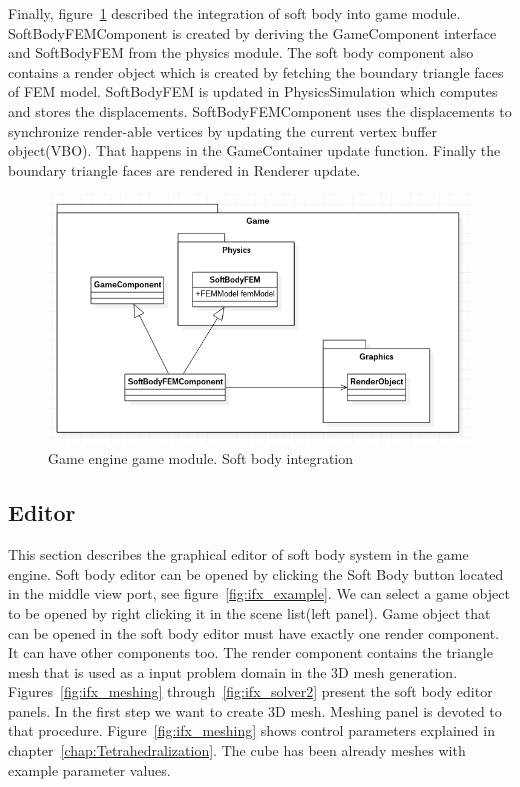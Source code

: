 \documentclass[en]{minipw} %
\begin{document}
Finally, figure~\ref{fig:ifx_game2} described the integration of soft body into game module. SoftBodyFEMComponent is created by deriving the GameComponent interface and SoftBodyFEM from the physics module. The soft body component also contains a render object which is created by fetching the boundary triangle faces of FEM model. SoftBodyFEM is updated in PhysicsSimulation which computes and stores the displacements. SoftBodyFEMComponent uses the displacements to synchronize render-able vertices by updating the current vertex buffer object(VBO). That happens in the GameContainer update function. Finally the boundary triangle faces are rendered in Renderer update.

\begin{figure}[h!]
\centering
\includegraphics[scale=0.5]{pictures/ifx_game2.png}
\caption[Game engine game module. Soft body integration]{Game engine game module. Soft body integration}
\label{fig:ifx_game2}
\end{figure}


\subsection{Editor}
This section describes the graphical editor of soft body system in the game engine. Soft body editor can be opened by clicking the Soft Body button located in the middle view port, see figure~\ref{fig:ifx_example}. We can select a game object to be opened by right clicking it in the scene list(left panel). Game object that can be opened in the soft body editor must have exactly one render component. It can have other components too. The render component contains the triangle mesh that is used as a input problem domain in the 3D mesh generation. Figures~\ref{fig:ifx_meshing} through~\ref{fig:ifx_solver2} present the soft body editor panels. In the first step we want to create 3D mesh. Meshing panel is devoted to that procedure. Figure~\ref{fig:ifx_meshing} shows control parameters explained in chapter~\ref{chap:Tetrahedralization}. The cube has been already meshes with example parameter values.
\end{document}
